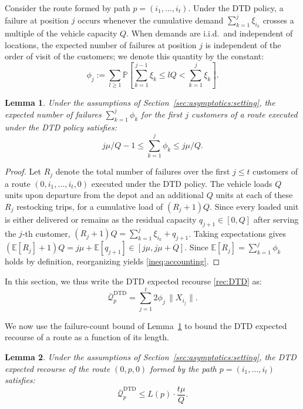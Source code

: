 \documentclass{article}
\newtheorem{lemma}{Lemma}
\begin{document}
{Consider the route formed by path $p = (i_1, \ldots, i_t)$. Under the DTD policy, a failure at position $j$ occurs whenever the cumulative demand $\sum_{k=1}^{j} \xi_{i_k}$ crosses a multiple of the vehicle capacity $Q$. When demands are i.i.d.\ and independent of locations, the expected number of failures at position $j$ is independent of the order of visit of the customers; we denote this quantity by the constant:
\begin{equation}\label{eq:phi_def}
    \phi_j := \sum_{l \geq 1} \mathbb{P}\!\left[\sum_{k=1}^{j-1} \xi_k \leq lQ < \sum_{k=1}^{j} \xi_k\right].
\end{equation}

\begin{lemma}\label{lem:accounting} Under the assumptions of Section~\ref{sec:asymptotics:setting}, the expected number of failures $\sum_{k=1}^j \phi_k$ for the first $j$ customers of a route executed under the DTD policy satisfies:
\begin{equation}\label{ineq:accounting}
    j\mu/Q - 1 \leq \sum_{k=1}^j \phi_k \leq j\mu/Q.
\end{equation}
\end{lemma}
\begin{proof}
    Let $R_j$ denote the total number of failures over the first $j \leq t$ customers of a route $(0, i_1, \ldots, i_t,0)$ executed under the DTD policy. The vehicle loads $Q$ units upon departure from the depot and an additional $Q$ units at each of these $R_j$ restocking trips, for a cumulative load of $(R_j+1)Q$. Since every loaded unit is either delivered or remains as the residual capacity $q_{j+1} \in [0, Q]$ after serving the $j$-th customer, $(R_j + 1) Q = \sum_{k=1}^j \xi_{i_k} + q_{j+1}$. Taking expectations gives $(\mathbb{E}[R_j] + 1) Q = j\mu + \mathbb{E}[q_{j+1}] \in [j\mu, j\mu + Q]$. Since $\mathbb{E}[R_j]=\sum_{k=1}^j \phi_k$ holds by definition, reorganizing yields \eqref{ineq:accounting}.
\end{proof}

In this section, we thus write the DTD expected recourse \eqref{rec:DTD} as:
\begin{equation}\label{eq:recourse_DTD}
    \bar{\mathcal{Q}}^{\text{DTD}}_{p} = \sum_{j=1}^t 2 \phi_j \, \| X_{i_j}\|.
\end{equation}

We now use the failure-count bound of Lemma~\ref{lem:accounting} to bound the DTD expected recourse of a route as a function of its length.

\begin{lemma}\label{lem:recourse_bound}
    Under the assumptions of Section~\ref{sec:asymptotics:setting}, the DTD expected recourse of the route $(0, p, 0)$ formed by the path $p = (i_1, \dots, i_t)$ satisfies:
    \begin{equation}\label{ineq:recourse_bound}
        \bar{\mathcal{Q}}^{\text{DTD}}_p \leq L(p) \cdot \frac{t\mu}{Q}.
    \end{equation}
\end{lemma}

}
\end{document}
